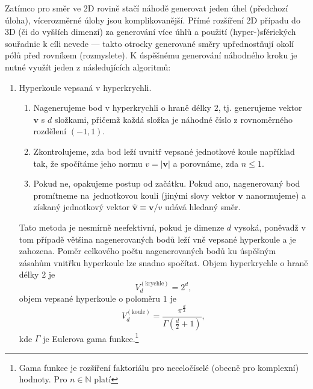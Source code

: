 \documentclass[a4paper,11pt,twoside]{article}
\def\vector#1{\boldsymbol{#1}}			%
\def\abs#1{\left|#1\right|}
\theoremstyle{red}
\theoremstyle{green}
\begin{document}
    \begin{solution}
        Zatímco pro směr ve 2D rovině stačí náhodě generovat jeden úhel (předchozí úloha), vícerozměrné úlohy jsou komplikovanější.
        Přímé rozšíření 2D případu do 3D (či do vyšších dimenzí) za generování více úhlů a použití (hyper-)sférických souřadnic k cíli nevede --- takto otrocky generované směry upřednostňují okolí pólů před rovníkem (rozmyslete).
        K úspěšnému generování náhodného kroku je nutné využít jeden z následujících algoritmů:
        \begin{enumerate}
            \item Hyperkoule vepsaná v hyperkrychli.
                \begin{enumerate}
                    \item Nagenerujeme bod v hyperkrychli o hraně délky $2$, tj. generujeme vektor $\vector{v}$ s $d$ složkami, přičemž každá složka je náhodné číslo z rovnoměrného rozdělení $(-1,1)$.
                    \item Zkontrolujeme, zda bod leží uvnitř vepsané jednotkové koule například tak, že spočítáme jeho normu $v=\abs{\vector{v}}$ a porovnáme, zda $n\leq1$.
                    \item Pokud ne, opakujeme postup od začátku.
                        Pokud ano, nagenerovaný bod promítneme na~jednotkovou kouli (jinými slovy vektor $\vector{v}$ nanormujeme) a získaný jednotkový vektor $\vector{\hat{v}}\equiv\vector{v}/v$ udává hledaný směr. 
                \end{enumerate}
                Tato metoda je nesmírně neefektivní, pokud je dimenze $d$ vysoká, poněvadž v tom případě většina nagenerovaných bodů leží vně vepsané hyperkoule a je zahozena.
                Poměr celkového počtu nagenerovaných bodů ku úspěšným zásahům vnitřku hyperkoule lze snadno spočítat.
                Objem hyperkrychle o hraně délky $2$ je
                \begin{equation}
                    V_{d}^{(\text{krychle})}=2^{d},
                \end{equation}
                objem vepsané hyperkoule o poloměru $1$ je
                \begin{equation}
                    V_{d}^{(\text{koule})}=\frac{\pi^{\frac{d}{2}}}{\Gamma\left(\frac{d}{2}+1\right)},
                \end{equation}
                kde $\Gamma$ je Eulerova gama funkce.\footnote{Gama funkce je rozšíření faktoriálu pro neceločíselé (obecně pro komplexní) hodnoty. Pro $n\in\mathbb{N}$ platí
}
\end{enumerate}
\end{solution}
\end{document}
